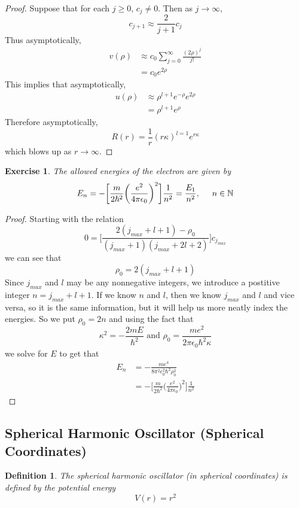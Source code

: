 \documentclass[12pt]{amsart}
\newtheorem{defn}[thm]{Definition}
\newtheorem{ex}[thm]{Exercise}
\newcommand{\ep}{\epsilon}
\newcommand{\N}{\mathbb{N}}
\begin{document}
\begin{proof}
Suppose that for each $j \geq 0$, $c_{j} \neq 0$. Then as $j \rightarrow \infty$, $$c_{j+1} \approx \frac{2}{j+1}c_j$$ Thus asymptotically, 
\begin{align*}
v(\rho) 
& \approx c_0\sum_{j=0}^\infty \frac{(2\rho)^j}{j!} \\ 
&= c_0e^{2\rho}
\end{align*} 
This implies that asymptotically, 
\begin{align*}
u(\rho)
&\approx \rho^{l+1}e^{-\rho}e^{2\rho} \\
&= \rho^{l+1}e^{\rho}
\end{align*} Therefore asymptotically, $$R(r) = \frac{1}{r}(r\kappa)^{l=1}e^{r\kappa}$$ which blows up as $r \rightarrow \infty$.
\end{proof}

\begin{ex}
The allowed energies of the electron are given by $$E_n = - \bigg[\frac{m}{2\hbar^2}\bigg(\frac{e^2}{4 \pi \ep_0}\bigg)^2 \bigg] \frac{1}{n^2} = \frac{E_1}{n^2}, \hspace{.5cm} n \in \N$$
\end{ex}

\begin{proof}
Starting with the relation $$0 = \bigg[ \frac{2(j_{max}+l+1) - \rho_0}{(j_{max}+1)(j_{max}+2l+2)}\bigg]c_{j_{max}}$$ we can see that  $$\rho_0 = 2(j_{max} + l + 1)$$ Since $j_{max}$ and $l$ may be any nonnegative integers, we introduce a postitive integer $n = j_{max} + l + 1$. If we know $n$ and $l$, then we know $j_{max}$ and $l$ and vice versa, so it is the same information, but it will help us more neatly index the energies. So we put $\rho_0 = 2n$ and using the fact that $$\kappa^2 = -\frac{2mE}{\hbar^2}\text{ and } \rho_0 = \frac{me^2}{2\pi\ep_0 \hbar^2 \kappa}$$ we solve for $E$ to get that
\begin{align*}
E_n 
&= -\frac{me^4}{8\pi^2 \ep_0^2 \hbar^2 \rho_0^2}\\
&= -\bigg[\frac{m}{2\hbar^2}\bigg(\frac{e^2}{4 \pi \ep_0}\bigg)^2 \bigg] \frac{1}{n^2}
\end{align*} 
\end{proof}

\subsection{Spherical Harmonic Oscillator (Spherical Coordinates)}
\begin{defn}
The spherical harmonic oscillator (in spherical coordinates) is defined by the potential energy
$$V(r) = r^2$$
\end{defn}
\end{document}
